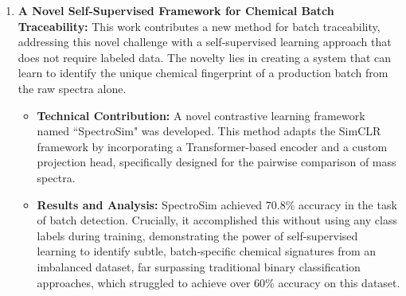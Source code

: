 \begin{enumerate}
\begin{itemize}
\item \textbf{Technical Contribution:}
A novel unsupervised pre-training technique, Masked Spectra Modeling (MSM), was developed by adapting BERT's masked language modeling for sequential REIMS data.
Transfer Learning approaches were explored for the MoE Transformer for REIMS-based data.
The successful adaptation of the deep learning methods (i.e., MoE and Ensemble Transformers) from the previous chapter's classification tasks to these more complex problems is a key contribution, demonstrating the robustness and versatility of the proposed architectures for these data.
An exploration of ordinal classification approaches to the oil contamination task is proposed.
\item \textbf{Results and Analysis:}
The models demonstrated strong performance on the test data, showing that pre-training improved accuracy.
A key finding was that the difficult task of oil contamination detection consistently benefited from transfer learning, regardless of the source task, improving accuracy on this task by up to 3.59\%.
This highlights that transfer learning is most effective for more challenging tasks with subtle chemical signals within this dataset.
The exploration of ordinal classification approaches for oil contamination concluded that for distance-aware metrics, ordinal classification approaches improved accuracy.
\end{itemize}
\item \textbf{A Novel Self-Supervised Framework for Chemical Batch Traceability:} This work contributes a new method for batch traceability, addressing this novel challenge with a self-supervised learning approach that does not require labeled data. The novelty lies in creating a system that can learn to identify the unique chemical fingerprint of a production batch from the raw spectra alone.
\begin{itemize}
\item \textbf{Technical Contribution:} A novel contrastive learning framework named ``SpectroSim" was developed. This method adapts the SimCLR framework by incorporating a Transformer-based encoder and a custom projection head, specifically designed for the pairwise comparison of mass spectra.
\item \textbf{Results and Analysis:} SpectroSim achieved 70.8\% accuracy in the task of batch detection. Crucially, it accomplished this without using any class labels during training, demonstrating the power of self-supervised learning to identify subtle, batch-specific chemical signatures from an imbalanced dataset, far surpassing traditional binary classification approaches, which struggled to achieve over 60\% accuracy on this dataset.
\end{itemize}
\end{enumerate}

